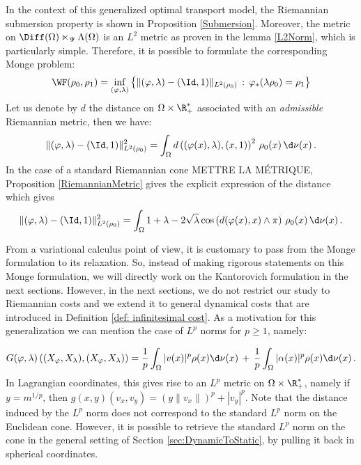 In the context of this generalized optimal transport model, the Riemannian submersion property is shown in Proposition \ref{Submersion}. Moreover, the metric on $\Diff(\Omega) \ltimes_\Psi \Lambda(\Omega)$ is an $L^2$ metric as proven in the lemma \ref{L2Norm}, which is particularly simple. Therefore, it is possible to formulate the corresponding Monge problem:
\begin{equation}
\WF(\rho_0, \rho_1) = \inf_{(\varphi,\lambda) } \left\{ \| (\varphi,\lambda) - (\Id,1)  \|_{L^2(\rho_0)} \, : \, \varphi_* (\lambda \rho_0 )= \rho_1 \right\}
\end{equation}
Let us denote by $d$ the distance on $\Omega \times \R_+^*$ associated with an \textit{admissible} Riemannian metric, then we have:
\begin{equation}
\| (\varphi,\lambda) - (\Id,1)  \|_{L^2(\rho_0)}^2 = \int_\Omega d\left( (\varphi(x),\lambda) , (x,1)\right)^2  \, \rho_0(x) \, \d \nu(x) \,.
\end{equation}
In the case of a standard Riemannian cone METTRE LA MÉTRIQUE, Proposition \ref{RiemannianMetric} gives the explicit expression of the distance which gives
\begin{equation}
\| (\varphi,\lambda) - (\Id,1)  \|_{L^2(\rho_0)}^2 = \int_\Omega 1 + \lambda -2\sqrt{\lambda}  \cos \left(d(\varphi(x),x) \wedge \pi \right)  \, \rho_0(x) \,  \d \nu(x)\,.
\end{equation}

From a variational calculus point of view, it is customary to pass from the Monge formulation to its relaxation. So, instead of making rigorous statements on this Monge formulation, we will directly work on the Kantorovich formulation in the next sections. However, in the next sections, we do not restrict our study to Riemannian costs and we extend it to general dynamical costs that are introduced in Definition \ref{def: infinitesimal cost}. As a motivation for this generalization we can mention the case of $L^p$ norms for $p\geq 1$, namely:

\begin{multline}
G(\varphi,\lambda)\left((X_\varphi,X_\lambda) , (X_\varphi,X_\lambda)\right)= \frac{1}{p} \int_{\Omega} | v(x)  |^p \rho(x)  \d \nu(x) \,+\, \frac{1}{p} \int_{\Omega}  | \alpha(x)|^p  \rho(x)  \d \nu(x) \,.
\end{multline}
In Lagrangian coordinates, this gives rise to an $L^p$ metric on $\Omega \times \R_+^*$, namely if $y=m^{1/p}$, then $g(x,y)(v_x,v_y) = (y \|v_x\|)^p + |v_y|^p$. Note that the distance induced by the $L^p$ norm does not correspond to the standard $L^p$ norm on the Euclidean cone. However, it is possible to retrieve the standard $L^p$ norm on the cone in the general setting of Section \ref{sec:DynamicToStatic}, by pulling it back in spherical coordinates.




